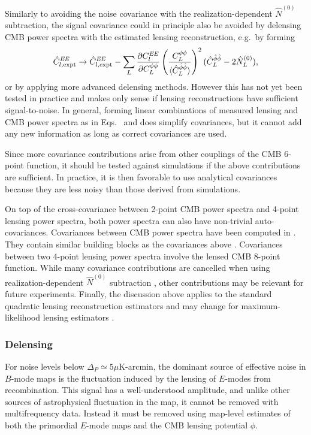 Similarly to avoiding the noise covariance with the realization-dependent $\hat N^{(0)}$ subtraction, the signal covariance could in principle also be avoided by delensing CMB power spectra with the estimated lensing reconstruction, e.g.~by forming \cite{marcel1308}
\begin{equation}
  \label{eq:matter_CV_mitigation}
  \hat{C}^{\mathit{EE}}_{l,\mathrm{expt}} \to  \hat{C}^{\mathit{EE}}_{l,\mathrm{expt}}- 
\sum_{L} 
 \frac{\partial C_{l}^{\mathit{EE}}}{\partial C_{L}^{\phi\phi}}
\left(\frac{C_{L}^{\phi\phi}}{\langle
\hat{C}_{L}^{\hat{\phi}\hat{\phi}}\rangle}\right)^2
(\hat{C}_{L}^{\hat{\phi}\hat{\phi}}-2\hat{N}_{L}^{(0)}),
\end{equation}
or by applying more advanced delensing methods.  However this has not yet been tested in practice and makes only sense if lensing reconstructions have sufficient signal-to-noise.  In general, forming linear combinations of measured lensing and CMB power spectra as in Eqs.~ and  does simplify covariances, but it cannot add any new information as long as correct covariances are used.


 Since more covariance contributions arise from other couplings of the CMB 6-point function, it should be tested against simulations if the above contributions are sufficient.  In practice, it is then favorable to use analytical covariances because they are less noisy than those derived from simulations.   
 
On top of the cross-covariance between 2-point CMB power spectra and 4-point lensing power spectra, both power spectra can also have non-trivial auto-covariances.  Covariances between CMB power spectra have been computed in \cite{2006PhRvD..74l3002S,2007PhRvD..75h3501L,BenoitSmithHu1205}. They contain similar building blocks as the covariances above \cite{BenoitSmithHu1205}.  Covariances between two 4-point lensing power spectra involve the lensed CMB 8-point function.  While many covariance contributions are cancelled when using realization-dependent $\hat N^{(0)}$ subtraction \cite{duncan1008}, other contributions may be relevant for future experiments.  Finally, the discussion above applies to the standard quadratic lensing reconstruction estimators and may change for maximum-likelihood lensing estimators \cite{HirataSeljak0209489}.

\subsubsection{Delensing}
For noise levels below $\Delta_P \simeq 5 \mu$K-arcmin,  the dominant source of effective noise in $B$-mode maps is the fluctuation induced by the lensing of $E$-modes from recombination.  This signal has a well-understood amplitude, and unlike other sources of astrophysical fluctuation in the map, it cannot be removed with multifrequency data.  Instead it must be removed using map-level estimates of both the primordial $E$-mode maps and the CMB lensing potential $\phi$.  

